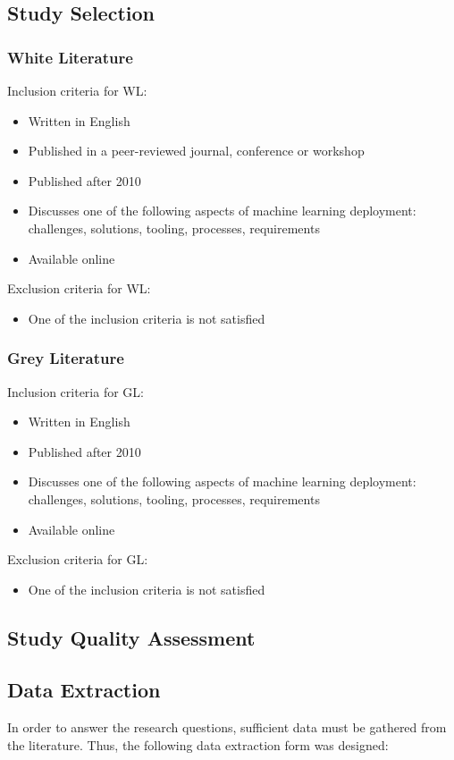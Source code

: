 \subsection{Study Selection}
\subsubsection{White Literature}
\label{subsubsec:white_literature_selection_criteria}
Inclusion criteria for WL:
\begin{itemize}
    \item Written in English
    \item Published in a peer-reviewed journal, conference or workshop
    \item Published after 2010
    \item Discusses one of the following aspects of machine learning deployment: challenges, solutions, tooling, processes, requirements
    \item Available online
\end{itemize}
Exclusion criteria for WL:
\begin{itemize}
    \item One of the inclusion criteria is not satisfied
\end{itemize}

\subsubsection{Grey Literature}
Inclusion criteria for GL:
\begin{itemize}
    \item Written in English
    \item Published after 2010
    \item Discusses one of the following aspects of machine learning deployment: challenges, solutions, tooling, processes, requirements
    \item Available online
\end{itemize}
Exclusion criteria for GL:
\begin{itemize}
    \item One of the inclusion criteria is not satisfied
\end{itemize}

\subsection{Study Quality Assessment}
\subsection{Data Extraction}
In order to answer the research questions, sufficient data must be gathered from the literature.
Thus, the following data extraction form was designed:

